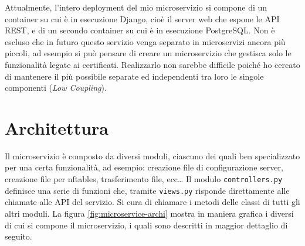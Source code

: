 Attualmente, l'intero deployment del mio microservizio si compone di un container
su cui è in esecuzione Django, cioè il server web che espone le API REST, e
di un secondo container su cui è in esecuzione PostgreSQL.
Non è escluso che in futuro questo servizio venga separato in microservizi
ancora più piccoli, ad esempio si può pensare di creare un microservizio
che gestisca solo le funzionalità legate ai certificati. Realizzarlo non sarebbe
difficile poiché ho cercato di mantenere il più possibile separate ed independenti
tra loro le singole componenti (\textit{Low Coupling}).

\section{Architettura}
Il microservizio è composto da diversi moduli, ciascuno dei quali ben
specializzato per una certa funzionalità, ad esempio: creazione file di configurazione
server, creazione file per nftables, trasferimento file, ecc\ldots
Il modulo \texttt{controllers.py}  definisce
una serie di funzioni che, tramite \texttt{views.py} risponde direttamente alle
chiamate alle API del servizio. Si cura di chiamare i metodi delle classi di tutti
gli altri moduli.
La figura \ref{fig:microservice-archi} mostra in maniera grafica i diversi di cui
si compone il microservizio, i quali sono descritti in maggior dettaglio di seguito.

